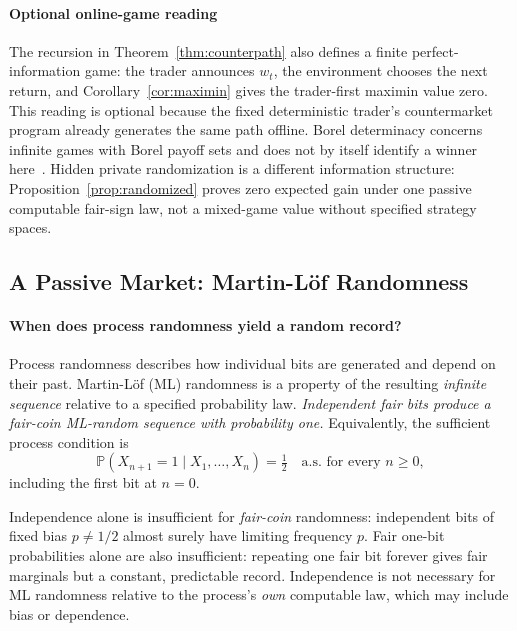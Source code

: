 \documentclass[aps,pra,reprint,superscriptaddress,amsmath,amssymb,floatfix]{revtex4-2}
\theoremstyle{plain}
\theoremstyle{definition}
\theoremstyle{remark}
\begin{document}
\paragraph{Optional online-game reading}

The recursion in Theorem~\ref{thm:counterpath} also defines a finite
perfect-information game: the trader announces \(w_t\), the environment chooses
the next return, and Corollary~\ref{cor:maximin} gives the trader-first maximin
value zero. This reading is optional because the fixed deterministic trader's
countermarket program already generates the same path offline. Borel
determinacy concerns infinite games with Borel payoff sets and does not by
itself identify a winner here~\cite{Martin1975}. Hidden private randomization is
a different information structure: Proposition~\ref{prop:randomized} proves
zero expected gain under one passive computable fair-sign law, not a mixed-game
value without specified strategy spaces.

\subsection{A Passive Market: Martin-L\"of Randomness}

\paragraph{When does process randomness yield a random record?}

Process randomness describes how individual bits are generated and depend on
their past. Martin-L\"of (ML) randomness is a property of the resulting
\emph{infinite sequence} relative to a specified probability law.
\emph{Independent fair bits produce a fair-coin ML-random sequence with
probability one.} Equivalently, the sufficient process condition is
\begin{equation}
  \mathbb P(X_{n+1}=1\mid X_1,\ldots,X_n)=\tfrac12
  \quad\text{a.s. for every }n\geq0,
  \label{eq:conditional-fairness}
\end{equation}
including the first bit at \(n=0\).

Independence alone is insufficient for \emph{fair-coin} randomness: independent
bits of fixed bias \(p\neq1/2\) almost surely have limiting frequency \(p\).
Fair one-bit probabilities alone are also insufficient: repeating one fair
bit forever gives fair marginals but a constant, predictable record.
Independence is not necessary for ML randomness relative to the process's
\emph{own} computable law, which may include bias or dependence.
\end{document}
